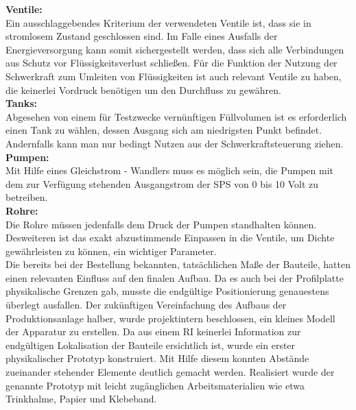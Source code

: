 	\textbf{Ventile:}\\
	Ein ausschlaggebendes Kriterium der verwendeten Ventile ist, dass sie in stromlosem Zustand geschlossen sind. Im Falle eines Ausfalls der Energieversorgung kann somit sichergestellt werden, dass sich alle Verbindungen aus Schutz vor Flüssigkeitsverlust schließen. Für die Funktion der Nutzung der Schwerkraft zum Umleiten von Flüssigkeiten ist auch relevant Ventile zu haben, die keinerlei Vordruck benötigen um den Durchfluss zu gewähren.\\

	\textbf{Tanks:}\\
	Abgesehen von einem für Testzwecke vernünftigen Füllvolumen ist es erforderlich einen Tank zu wählen, dessen Ausgang sich am niedrigsten Punkt befindet. Andernfalls kann man nur bedingt Nutzen aus der Schwerkraftsteuerung ziehen.\\
	
	\textbf{Pumpen:}\\
	Mit Hilfe eines Gleichstrom - Wandlers muss es möglich sein, die Pumpen mit dem zur Verfügung stehenden Ausgangstrom der \ac{SPS} von 0 bis 10 Volt zu betreiben.\\
	
	\textbf{Rohre:}\\
	Die Rohre müssen jedenfalls dem Druck der Pumpen standhalten können. Desweiteren ist das exakt abzustimmende Einpassen in die Ventile, um Dichte gewährleisten zu können, ein wichtiger Parameter.\\

	Die bereits bei der Bestellung bekannten, tatsächlichen Maße der Bauteile, hatten einen relevanten Einfluss auf den finalen Aufbau. Da es auch bei der Profilplatte physikalische Grenzen gab, musste die endgültige Positionierung genauestens überlegt ausfallen. Der zukünftigen Vereinfachung des Aufbaus der Produktionsanlage halber, wurde projektintern beschlossen, ein kleines Modell der Apparatur zu erstellen. Da aus einem \ac{RI} keinerlei Information zur endgültigen Lokalisation der Bauteile ersichtlich ist, wurde ein erster physikalischer Prototyp konstruiert. Mit Hilfe diesem konnten Abstände zueinander stehender Elemente deutlich gemacht werden. Realisiert wurde der genannte Prototyp mit leicht zugänglichen Arbeitsmaterialien wie etwa Trinkhalme, Papier und Klebeband.\\

